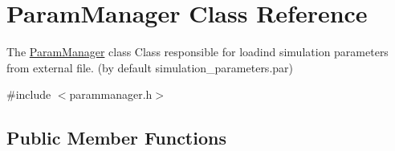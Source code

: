 \hypertarget{classParamManager}{}\section{Param\+Manager Class Reference}
\label{classParamManager}


The \hyperlink{classParamManager}{Param\+Manager} class Class responsible for loadind simulation parameters from external file. (by default simulation\+\_\+parameters.\+par)  




{\ttfamily \#include $<$parammanager.\+h$>$}

\subsection*{Public Member Functions}
